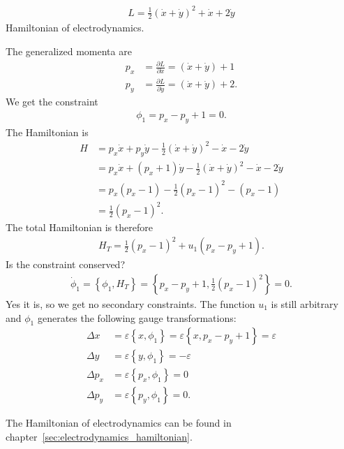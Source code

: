 \begin{exercise}
\begin{align*}
L = \frac{1}{2} (\dot{x} + \dot{y})^2 + \dot{x} + 2 \dot{y}
\end{align*}
Hamiltonian of electrodynamics.
\end{exercise}
\begin{solution}
The generalized momenta are
\begin{align*}
p_x &= \frac{\partial L}{\partial \dot{x}} = (\dot{x} + \dot{y}) + 1 \\
p_y &= \frac{\partial L}{\partial \dot{y}} = (\dot{x} + \dot{y}) + 2.
\end{align*}
We get the constraint 
\begin{align*}
\phi_1 = p_x - p_y + 1 = 0.
\end{align*}
The Hamiltonian is
\begin{align*}
H &= p_x \dot{x} + p_y \dot{y} - \frac{1}{2} (\dot{x} + \dot{y})^2 - \dot{x} - 2 \dot{y} \\
&= p_x \dot{x} + (p_x + 1) \dot{y} - \frac{1}{2} (\dot{x} + \dot{y})^2 - \dot{x} - 2 \dot{y} \\
&= p_x (p_x - 1) - \frac{1}{2} (p_x - 1)^2 - (p_x - 1) \\
&= \frac{1}{2} (p_x - 1)^2.
\end{align*}
The total Hamiltonian is therefore
\begin{align*}
H_T = \frac{1}{2} (p_x - 1)^2 + u_1 (p_x - p_y + 1).
\end{align*}
Is the constraint conserved?
\begin{align*}
\dot{\phi}_1 = \left \{ \phi_1,H_T \right \} = \left \{ p_x - p_y + 1,\frac{1}{2} (p_x - 1)^2 \right \} = 0.
\end{align*}
Yes it is, so we get no secondary constraints. The function $u_1$ is still arbitrary and $\phi_1$ generates the following gauge transformations:
\begin{align*}
\Delta x &= \varepsilon \left \{ x,\phi_1 \right \} = \varepsilon \left \{ x,p_x - p_y + 1 \right \} = \varepsilon \\
\Delta y &= \varepsilon \left \{ y,\phi_1 \right \} = - \varepsilon \\
\Delta p_x &= \varepsilon \left \{ p_x,\phi_1 \right \} = 0 \\
\Delta p_y &= \varepsilon \left \{ p_y,\phi_1 \right \} = 0.
\end{align*}

The Hamiltonian of electrodynamics can be found in chapter~\vref{sec:electrodynamics_hamiltonian}.
\end{solution}





